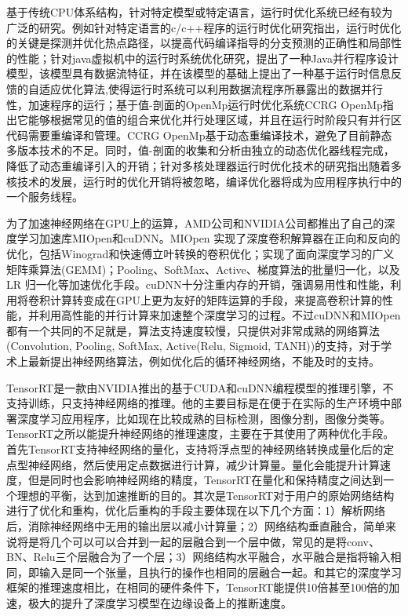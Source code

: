 基于传统CPU体系结构，针对特定模型或特定语言，运行时优化系统已经有较为广泛的研究。例如针对特定语言的c/c++程序的运行时优化研究指出，运行时优化的关键是探测并优化热点路径，以提高代码编译指导的分支预测的正确性和局部性的性能\cite{zxj}；针对java虚拟机中的运行时系统优化研究，提出了一种Java并行程序设计模型，该模型具有数据流特征，并在该模型的基础上提出了一种基于运行时信息反馈的自适应优化算法,使得运行时系统可以利用数据流程序所暴露出的数据并行性，加速程序的运行\cite{fbwcy}；基于值-剖面的OpenMp运行时优化系统CCRG OpenMp指出它能够根据常见的值的组合来优化并行处理区域，并且在运行时阶段只有并行区代码需要重编译和管理。CCRG OpenMp基于动态重编译技术，避免了目前静态多版本技术的不足。同时，值-剖面的收集和分析由独立的动态优化器线程完成，降低了动态重编译引入的开销\cite{hcyxj}；针对多核处理器运行时优化技术的研究指出随着多核技术的发展，运行时的优化开销将被忽略，编译优化器将成为应用程序执行中的一个服务线程\cite{lxy}。

为了加速神经网络在GPU上的运算，AMD公司和NVIDIA公司都推出了自己的深度学习加速库MIOpen\cite{miopen}和cuDNN\cite{cudnn}。MIOpen 实现了深度卷积解算器在正向和反向的优化，包括Winograd和快速傅立叶转换的卷积优化；实现了面向深度学习的广义矩阵乘算法(GEMM)；Pooling、SoftMax、Active、梯度算法的批量归一化，以及LR 归一化等加速优化手段。cuDNN十分注重内存的开销，强调易用性和性能，利用将卷积计算转变成在GPU上更为友好的矩阵运算的手段，来提高卷积计算的性能，并利用高性能的并行计算来加速整个深度学习的过程。不过cuDNN和MIOpen都有一个共同的不足就是，算法支持速度较慢，只提供对非常成熟的网络算法(Convolution, Pooling, SoftMax, Active(Relu, Sigmoid, TANH))的支持，对于学术上最新提出神经网络算法，例如优化后的循环神经网络，不能及时的支持\cite{yzg}。

TensorRT\cite{tensorrt}是一款由NVIDIA推出的基于CUDA\cite{cuda}和cuDNN编程模型的推理引擎，不支持训练，只支持神经网络的推理。他的主要目标是在便于在实际的生产环境中部署深度学习应用程序，比如现在比较成熟的目标检测，图像分割，图像分类等。TensorRT之所以能提升神经网络的推理速度，主要在于其使用了两种优化手段。首先TensorRT支持神经网络的量化，支持将浮点型的神经网络转换成量化后的定点型神经网络，然后使用定点数据进行计算，减少计算量。量化会能提升计算速度，但是同时也会影响神经网络的精度，TensorRT在量化和保持精度之间达到一个理想的平衡，达到加速推断的目的。其次是TensorRT对于用户的原始网络结构进行了优化和重构\cite{tensorrtinference}，优化后重构的手段主要体现在以下几个方面：1）解析网络后，消除神经网络中无用的输出层以减小计算量；2）网络结构垂直融合，简单来说将是将几个可以可以合并到一起的层融合到一个层中做，常见的是将conv、BN、Relu三个层融合为了一个层；3）网络结构水平融合，水平融合是指将输入相同，即输入是同一个张量，且执行的操作也相同的层融合一起。和其它的深度学习框架的推理速度相比，在相同的硬件条件下，TensorRT能提供10倍甚至100倍的加速，极大的提升了深度学习模型在边缘设备上的推断速度。

